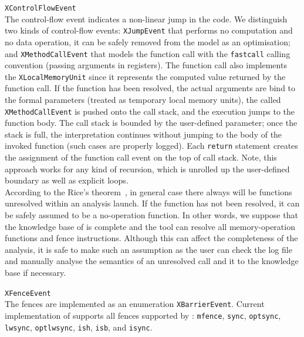 \begin{outline}
  \1 \texttt{XControlFlowEvent} \\
    The control-flow event indicates a non-linear jump in the code. We distinguish two kinds of control-flow events: 
    \2 \texttt{XJumpEvent} that performs no computation and no data operation, it can be safely removed from the model as an optimisation; and
    \2 \texttt{XMethodCallEvent} that models the function call with the \texttt{fastcall} calling convention (passing arguments in registers).
    The function call also implements the \texttt{XLocalMemoryUnit} since it represents the computed value returned by the function call.
    If the function has been resolved, the actual arguments are bind to the formal parameters (treated as temporary local memory units), the called \texttt{XMethodCallEvent} is pushed onto the call stack, and the execution jumps to the function body.
    The call stack is bounded by the user-defined parameter; once the stack is full, the interpretation continues without jumping to the body of the invoked function (such cases are properly logged). %
    Each \texttt{return} statement creates the assignment of the function call event on the top of call stack.
    Note, this approach works for any kind of recursion, which is unrolled up the user-defined boundary as well as explicit loops.
    \\
    According to the Rice's theorem~\cite{rice1953classes}, in general case there always will be functions unresolved within an analysis launch.
    If the function has not been resolved, it can be safely assumed to be a no-operation function.
    In other words, we suppose that the knowledge base of \porthos[2] is complete and the tool can resolve all memory-operation functions and fence instructions.
    Although this can affect the completeness of the analysis, it is safe to make such an assumption as the user can check the log file and manually analyse the semantics of an unresolved call and it to the knowledge base if necessary.

  \1 \texttt{XFenceEvent} \\
    The fences are implemented as an enumeration \texttt{XBarrierEvent}.
    Current implementation of \porthos[2] supports all fences supported by \porthos{}: 
    \texttt{mfence}, %
    \texttt{sync}, \texttt{optsync}, \texttt{lwsync}, \texttt{optlwsync}, \texttt{ish}, \texttt{isb}, and \texttt{isync}.%
    

\end{outline}
